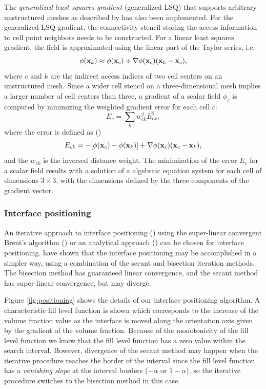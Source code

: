The \emph{generalized least squares gradient} (generalized LSQ) that supports
arbitrary unstructured meshes as described by \citet{lsq-revisiting} has also
been implemented. For the generalized LSQ gradient, the connectivity stencil
storing the access information to cell point neighbors needs to be
constructed. For a linear least squares gradient, the field is approximated
using the linear part of the Taylor series, i.e. 
%
\begin{equation}
    \phi(\mathbf x_{k}) \approx  \phi(\mathbf x_{c}) + \nabla{\phi}(\mathbf x_{c}) (\mathbf x_{k} - \mathbf x_{c}),
\end{equation}
%
where $c$ and $k$ are the indirect access indices of two cell centers on an
unstructured mesh. Since a wider cell stencil on a three-dimensional mesh
implies a larger number of cell centers than three, a gradient of a scalar
field $\phi_c$ is computed by minimizing the weighted gradient error for each cell $c$:
%
\begin{equation}
    E_c = \sum_k w_{ck}^2 E_{ck}^2,   
    \label{eqn:generalizedLSQminimize}
\end{equation}
%
where the error is defined as (\citep[]{lsq-revisiting})
%
\begin{equation}
    E_{ck} = -[\phi(\mathbf x_{c}) - \phi(\mathbf x_{k})] + \nabla{\phi}(\mathbf x_c) (\mathbf x_c - \mathbf x_k),
\end{equation}
%
and the $w_{ck}$ is the inversed distance weight. The minimization of the error
$E_c$ for a scalar field results with a solution of a  algebraic equation
system for each cell of dimensions $3\times3$, with the dimensions defined by
the three components of the gradient vector. 

\subsubsection{Interface positioning}

An iterative approach to interface positioning
(\citet{RiderReconstructing1998}) using the super-linear convergent Brent's
algorithm (\citet{BrentAlgorithm}) or an analytical approach
(\citet{ScardovelliAnalytical2000}) can be chosen for interface positioning.
\citet{AhnShashkovMultiMaterialRec2007} have shown that the interface
positioning may be accomplished in a simpler way, using a combination of the
secant and bisection iteration methods. The bisection method has guaranteed
linear convergence, and the secant method has super-linear convergence, but may
diverge. 

Figure \ref{fig:positioning} shows the details of our interface positioning
algorithm. A characteristic fill level function is shown which corresponds to
the increase of the volume fraction value as the interface is moved along the
orientation axis given by the gradient of the volume fraction. Because of the
monotonicity of the fill level function we know that the fill level function
has a zero value within the search interval. However, divergence of the secant
method may happen when the iterative procedure reaches the border of the
interval since the fill level function has a \emph{vanishing slope} at the
interval borders ($-\alpha$ or $1 - \alpha$), so the iterative procedure
switches to the bisection method in this case. 

